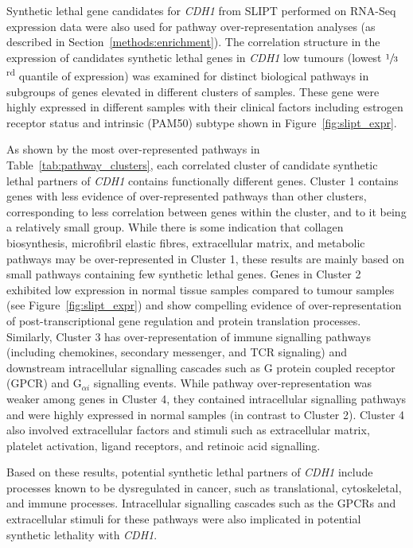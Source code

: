 Synthetic lethal gene candidates for \textit{CDH1} from SLIPT performed on RNA-Seq expression data were also used for pathway over-representation analyses (as described in Section~\ref{methods:enrichment}). The correlation structure in the expression of candidates synthetic lethal genes in \textit{CDH1} low tumours (lowest $\sfrac{1}{3}$\textsuperscript{rd} quantile of expression) was examined for distinct biological pathways in subgroups of genes elevated in different clusters of samples. These gene were highly expressed in different samples with their clinical factors including estrogen receptor status and intrinsic (PAM50) subtype \citep{Parker2009} shown in Figure~\ref{fig:slipt_expr}.

As shown by the most over-represented pathways in Table~\ref{tab:pathway_clusters}, each correlated cluster of candidate synthetic lethal partners of \textit{CDH1} contains functionally different genes. %
Cluster 1 contains genes with less evidence of over-represented pathways than other clusters, corresponding to less correlation between genes within the cluster, and to it being a relatively small group. While there is some indication that collagen biosynthesis, microfibril elastic fibres, extracellular matrix, and metabolic pathways may be over-represent\-ed in Cluster 1, these results are mainly based on small pathways containing few synthetic lethal genes. Genes in Cluster 2 exhibited low expression in normal tissue samples compared to tumour samples (see Figure~\ref{fig:slipt_expr}) and show compelling evidence of over-represent\-ation of post-transcriptional gene regulation and protein translation processes. Similarly, Cluster 3 has over-represent\-ation of immune signalling pathways (including chemokines, secondary messenger, and TCR signaling) and downstream intracellular signalling cascades such as G protein coupled receptor (GPCR) and  G$_{\alpha i}$ signalling events. While pathway over-represent\-ation was weaker among genes in Cluster 4, they contained intracellular signalling pathways and were highly expressed in normal samples (in contrast to Cluster 2). Cluster 4 also involved extracellular factors and stimuli such as extracellular matrix, platelet activation, ligand receptors, and retinoic acid signalling.

Based on these results, potential synthetic lethal partners of \textit{CDH1} include processes known to be dysregulated in cancer, such as translational, cytoskeletal, and immune processes. Intracellular signalling cascades such as the GPCRs and extracellular stimuli for these pathways were also implicated in potential synthetic lethality with \textit{CDH1}.

